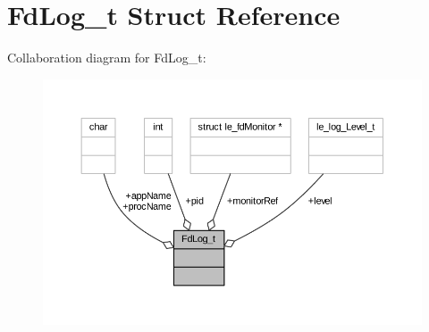 \hypertarget{struct_fd_log__t}{}\section{Fd\+Log\+\_\+t Struct Reference}
\label{struct_fd_log__t}


Collaboration diagram for Fd\+Log\+\_\+t\+:
\nopagebreak
\begin{figure}[H]
\begin{center}
\leavevmode
\includegraphics[width=350pt]{struct_fd_log__t__coll__graph}
\end{center}
\end{figure}
